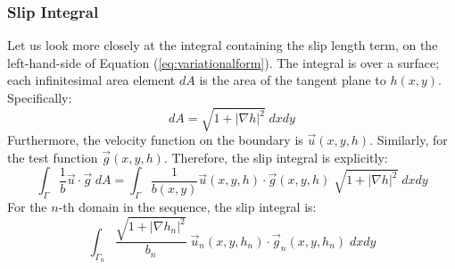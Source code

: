 \documentclass[12pt, a4paper, twoside, openright]{book}
\begin{document}


\subsubsection{Slip Integral}

Let us look more closely at the integral containing the slip length term, on the left-hand-side of Equation (\ref{eq:variationalform}).  The integral is over a surface; each infinitesimal area element $dA$ is the area of the tangent plane to $h(x,y)$. Specifically:
\begin{equation}
dA = \sqrt{1 + \lvert \nabla h \rvert^2} \;dxdy
\end{equation}
Furthermore, the velocity function on the boundary is $\vec{u}(x,y,h)$.  Similarly, for the test function $\vec{g}(x,y,h)$.
Therefore, the slip integral is explicitly:
\begin{equation}
\int_{\Gamma} \frac{1}{b} \vec{u} \cdot \vec{g} \;dA =
\int_{\Gamma} \frac{1}{b(x,y)} \vec{u}(x,y,h) \cdot \vec{g}(x,y,h) 
\;\sqrt{1 + \lvert \nabla h \rvert^2} \;dxdy
\end{equation}
For the $n$-th domain in the sequence, the slip integral is:
\begin{equation}
\int_{\Gamma_n} \frac{\sqrt{1 + \lvert \nabla h_n \rvert^2}}{b_n} \;
 \vec{u}_n(x,y,h_n) \cdot \vec{g}_n(x,y,h_n) \;dxdy
\end{equation}
\end{document}
